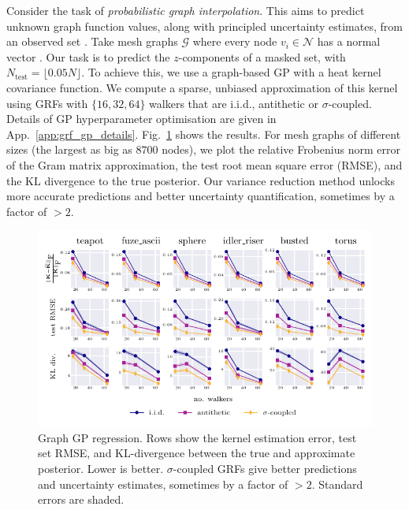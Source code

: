 Consider the task of \emph{probabilistic graph interpolation}.
This aims to predict unknown graph function values, along with principled uncertainty estimates, from an observed set \citep{pfaff2020learning}.
Take mesh graphs $\mathcal{G}$ where every node $v_i \in \mathcal{N}$ has a normal vector  \citep{trimesh}. 
Our task is to predict the $z$-components of a masked set,  with $N_\textrm{test}= \lfloor 0.05N \rfloor$.
To achieve this, we use a graph-based GP with a heat kernel covariance function. 
We compute a sparse, unbiased approximation of this kernel using GRFs with $\{16,32,64\}$ walkers that are i.i.d., antithetic \citep{reid2023quasi} or $\sigma$-coupled. 
Details of GP hyperparameter optimisation are given in App.~\ref{app:grf_gp_details}.
Fig.~\ref{fig:graph_gps_results_2} shows the results. 
For mesh graphs of different sizes (the largest as big as $8700$ nodes), we plot the relative Frobenius norm error of the Gram matrix approximation, the test root mean square error (RMSE), and the KL divergence to the true posterior.
Our variance reduction method unlocks more accurate predictions and better uncertainty quantification, sometimes by a factor of $>2$. 
\vspace{-4mm}
\begin{figure}[H] 
    \centering \hspace{-12mm}
    \includegraphics{images/tuned_graph_gps.pdf}
    \vspace{-3.5mm}
    \caption{Graph GP regression. Rows show the kernel estimation error, test set RMSE, and KL-divergence between the true and approximate posterior. Lower is better.
    $\sigma$-coupled GRFs give better predictions and uncertainty estimates, sometimes by a factor of $>2$. Standard errors are shaded.}
    \label{fig:graph_gps_results_2} \vspace{-5mm}
\end{figure}

